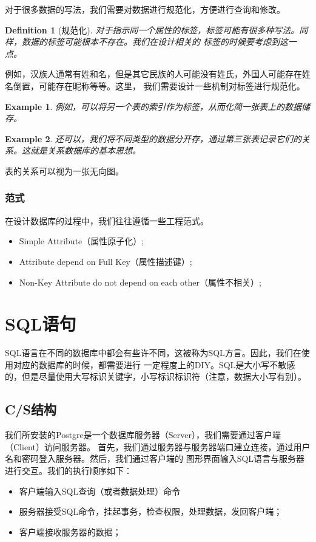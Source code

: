\documentclass[12pt,a4paper,UTF8]{ctexbook}
\theoremstyle{plain}
\newtheorem{definition}{\indent Definition}[chapter]
\newtheorem{example}{\indent Example}[chapter]
\begin{document}
对于很多数据的写法，我们需要对数据进行规范化，方便进行查询和修改。
\begin{definition}[规范化]
    对于指示同一个属性的标签，标签可能有很多种写法。同样，数据的标签可能根本不存在。我们在设计相关的
    标签的时候要考虑到这一点。
\end{definition} 
例如，汉族人通常有姓和名，但是其它民族的人可能没有姓氏，外国人可能存在姓名倒置，可能存在昵称等等。这里，
我们需要设计一些机制对标签进行规范化。

\begin{example}
    例如，可以将另一个表的索引作为标签，从而化简一张表上的数据储存。
\end{example}

\begin{example}
    还可以，我们将不同类型的数据分开存，通过第三张表记录它们的关系。这就是关系数据库的基本思想。
\end{example}


表的关系可以视为一张无向图。

\subsection{范式} 
在设计数据库的过程中，我们往往遵循一些工程范式。
\begin{itemize} 
    \item Simple Attribute（属性原子化）;
    \item Attribute depend on Full Key（属性描述键）;
    \item Non-Key Attribute do not depend on each other（属性不相关）;
\end{itemize} 


\chapter{SQL语句}
SQL语言在不同的数据库中都会有些许不同，这被称为SQL方言。因此，我们在使用对应的数据库的时候，都需要进行
一定程度上的DIY。SQL是大小写不敏感的，但是尽量使用大写标识关键字，小写标识标识符（注意，数据大小写有别）。
\section{C/S结构}
我们所安装的Postgre是一个数据库服务器（Server），我们需要通过客户端（Client）访问服务器。
首先，我们通过服务器与服务器端口建立连接，通过用户名和密码登入服务器。然后，我们通过客户端的
图形界面输入SQL语言与服务器进行交互。我们的执行顺序如下：
\begin{itemize} 
    \item 客户端输入SQL查询（或者数据处理）命令
    \item 服务器接受SQL命令，挂起事务，检查权限，处理数据，发回客户端；
    \item 客户端接收服务器的数据；
\end{itemize}
\end{document}
